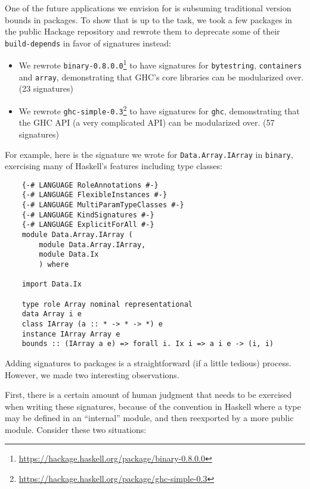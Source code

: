 One of the future applications we envision for \Backpack{} is subsuming
traditional version bounds in packages.  To show that \Backpack{} is up
to the task, we took a few packages in the public Hackage repository and
rewrote them to deprecate some of their \verb|build-depends| in favor of
signatures instead:

\begin{itemize}
    \item We rewrote \texttt{binary-0.8.0.0}\footnote{\smaller\url{https://hackage.haskell.org/package/binary-0.8.0.0}}
          to have signatures
          for \texttt{byte\-string}, \texttt{containers} and \texttt{array},
          demonstrating that GHC's core libraries can be modularized
          over. (23 signatures)

    \item We rewrote \texttt{ghc-simple-0.3}\footnote{\smaller\url{https://hackage.haskell.org/package/ghc-simple-0.3}} to have signatures
          for \texttt{ghc}, demonstrating that the GHC API (a very
          complicated API) can be modularized over. (57 signatures)
\end{itemize}
%
For example, here is the signature we wrote for
\texttt{Data.\allowbreak{}Array.\allowbreak{}IArray} in \texttt{binary},
exercising many of Haskell's features including type classes:

\begin{verbatim}
    {-# LANGUAGE RoleAnnotations #-}
    {-# LANGUAGE FlexibleInstances #-}
    {-# LANGUAGE MultiParamTypeClasses #-}
    {-# LANGUAGE KindSignatures #-}
    {-# LANGUAGE ExplicitForAll #-}
    module Data.Array.IArray (
        module Data.Array.IArray,
        module Data.Ix
        ) where

    import Data.Ix

    type role Array nominal representational
    data Array i e
    class IArray (a :: * -> * -> *) e
    instance IArray Array e
    bounds :: (IArray a e) => forall i. Ix i => a i e -> (i, i)
\end{verbatim}
%
Adding signatures to packages is a straightforward (if a little tedious)
process.  However, we made two interesting observations.

First, there is a certain amount of human judgment that needs to be
exercised when writing these signatures, because of the convention in
Haskell where a type may be defined in an ``internal'' module, and then
reexported by a more public module.  Consider these two situations:

